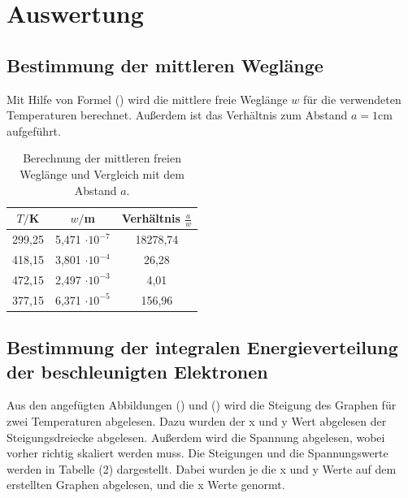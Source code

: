 
\section{Auswertung}
\label{sec:Auswertung}

\subsection{Bestimmung der mittleren Weglänge}
Mit Hilfe von Formel () wird die mittlere freie Weglänge $w$ für die verwendeten Temperaturen berechnet. Außerdem ist das Verhältnis zum Abstand $a = 1 \si{\cm}$ aufgeführt.
\begin{table}[H]
  \centering
  \caption{Berechnung der mittleren freien Weglänge und Vergleich mit dem Abstand $a$.}
  \label{tab:Parameter}
  \begin{tabular}{c c c}
    \toprule
    $T/$K& $w/$m  & Verhältnis $\frac{a}{w}$ \\
    \bottomrule
    299,25 & 5,471 $\cdot 10^{-7}$ & 18278,74 \\
    418,15 & 3,801 $\cdot 10^{-4}$ & 26,28\\
    472,15 & 2,497 $\cdot 10^{-3}$ & 4,01\\
    377,15 & 6,371 $\cdot 10^{-5}$ & 156,96\\
     \bottomrule
  \end{tabular}
\end{table}


\subsection{Bestimmung der integralen Energieverteilung der beschleunigten Elektronen}

Aus den angefügten Abbildungen () und () wird die Steigung des Graphen für zwei Temperaturen abgelesen. 
Dazu wurden der x und y Wert abgelesen der Steigungsdreiecke abgelesen. Außerdem wird die Spannung abgelesen, wobei vorher richtig skaliert werden muss. Die Steigungen und die Spannungswerte werden in Tabelle (2) dargestellt.
Dabei wurden je die x und y Werte auf dem erstellten Graphen abgelesen, und die x Werte genormt.

